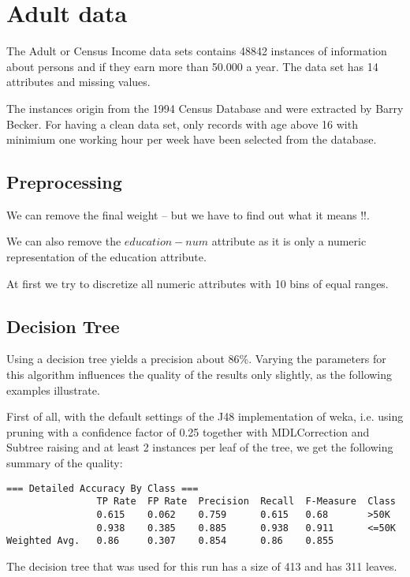 \documentclass[paper=a4, fontsize=11pt]{scrartcl} %
\numberwithin{equation}{section} %
\numberwithin{figure}{section} %
\numberwithin{table}{section} %
\begin{document}
\section{Adult data}

The Adult or Census Income data sets contains 48842 instances of information about persons and if they earn more than 50.000 a year. The data set has 14 attributes and missing values.

The instances origin from the 1994 Census Database and were extracted by Barry Becker. For having a clean data set, only records with age above 16 with minimium one working hour per week have been selected from the database.

\subsection{Preprocessing}

We can remove the final weight -- but we have to find out what it means !!.

We can also remove the $education-num$ attribute as it is only a numeric representation of the education attribute.

At first we try to discretize all numeric attributes with 10 bins of equal ranges.




\subsection{Decision Tree}
Using a decision tree yields a precision about 86\%. Varying the parameters for this algorithm influences the quality of the results only slightly, as the following examples illustrate.

First of all, with the default settings of the J48 implementation of weka, i.e. using pruning with a confidence factor of 0.25 together with MDLCorrection and Subtree raising and at least 2 instances per leaf of the tree, we get the following summary of the quality:
 
\begin{lstlisting}
=== Detailed Accuracy By Class ===
                TP Rate  FP Rate  Precision  Recall  F-Measure  Class
                0.615    0.062    0.759      0.615   0.68       >50K
                0.938    0.385    0.885      0.938   0.911      <=50K
Weighted Avg.   0.86     0.307    0.854      0.86    0.855      
\end{lstlisting}

The decision tree that was used for this run has a size of 413 and has 311 leaves.
\end{document}
